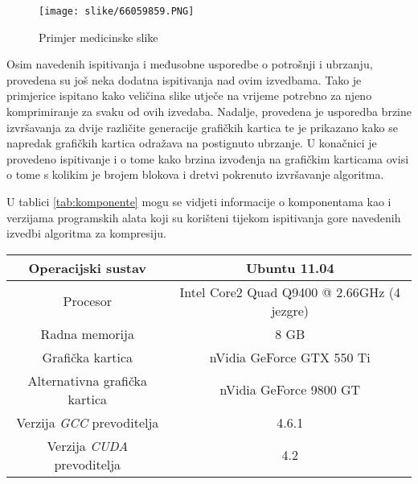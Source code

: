 \documentclass[times, utf8, zavrsni, numeric, sort]{fer}
\begin{document}
\begin{figure}[htb]
\centering
\texttt{[image: slike/66059859.PNG]}
\caption{Primjer medicinske slike}
\label{tab:primjerslike}
\end{figure}


Osim navedenih ispitivanja i međusobne usporedbe o potrošnji i ubrzanju, provedena su još neka dodatna ispitivanja nad ovim izvedbama. Tako je primjerice ispitano kako veličina slike utječe na vrijeme potrebno za njeno komprimiranje za svaku od ovih izvedaba. Nadalje, provedena je usporedba brzine izvršavanja za dvije različite generacije grafičkih kartica te je prikazano kako se napredak grafičkih kartica odražava na postignuto ubrzanje. U konačnici je provedeno ispitivanje i o tome kako brzina izvođenja na grafičkim karticama ovisi o tome s kolikim je brojem blokova i dretvi pokrenuto izvršavanje algoritma.

U tablici \ref{tab:komponente} mogu se vidjeti informacije o komponentama kao i verzijama programskih alata koji su korišteni tijekom ispitivanja gore navedenih izvedbi algoritma za kompresiju.

\begin{center}
 \label{tab:komponente}
\begin{tabular}{| c | c |}
\hline
Operacijski sustav & Ubuntu 11.04
\\
\hline
Procesor & Intel Core2 Quad Q9400 @ 2.66GHz (4 jezgre)
\\
\hline
Radna memorija & 8 GB
\\
\hline
Grafička kartica & nVidia GeForce GTX 550 Ti
\\
\hline
Alternativna grafička kartica & nVidia GeForce 9800 GT
\\
\hline
Verzija \emph{GCC} prevoditelja & 4.6.1
\\
\hline
Verzija  \emph{CUDA} prevoditelja & 4.2
\\
\hline
\end{tabular}
\end{center}



\begin{comment}
Testiranja su vođena na računalu s operacijskim sustavom Ubuntu 11.04. Za testove je bio korišten četverojezgreni procesor Intel Core2 Q9400 sa radnim taktom od 2.66GHz i radnom memorijom od 8GB. Grafička kartica koja je korištena za provođenje testova jest nVidia GeForce GTX 550 Ti. Osim te kartice korištena je još i grafička kartica nVidia GeForce 9800 GT za usporedbu performansi između različitih generacija grafičkih kartica. Tijekom testiranja, na računalu je bio pokrenut samo algoritam za kompresiju,  kako bi se mogli dobiti što relevantniji rezultati. Verzija \emph{GCC} programskog prevoditelja koja je korišrena za prevođenje svih implementacija jest 4.6.1. Verzija \emph{CUDA} programskog prevoditelja koja je bila korištena za eksperimente jest 4.2.
\end{comment}
\end{document}
